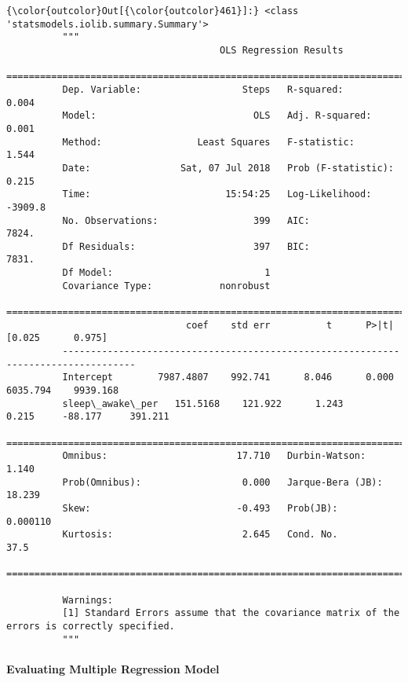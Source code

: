 \documentclass[11pt]{article}
\begin{document}
\begin{Verbatim}[commandchars=\\\{\}]
{\color{outcolor}Out[{\color{outcolor}461}]:} <class 'statsmodels.iolib.summary.Summary'>
          """
                                      OLS Regression Results                            
          ==============================================================================
          Dep. Variable:                  Steps   R-squared:                       0.004
          Model:                            OLS   Adj. R-squared:                  0.001
          Method:                 Least Squares   F-statistic:                     1.544
          Date:                Sat, 07 Jul 2018   Prob (F-statistic):              0.215
          Time:                        15:54:25   Log-Likelihood:                -3909.8
          No. Observations:                 399   AIC:                             7824.
          Df Residuals:                     397   BIC:                             7831.
          Df Model:                           1                                         
          Covariance Type:            nonrobust                                         
          ===================================================================================
                                coef    std err          t      P>|t|      [0.025      0.975]
          -----------------------------------------------------------------------------------
          Intercept        7987.4807    992.741      8.046      0.000    6035.794    9939.168
          sleep\_awake\_per   151.5168    121.922      1.243      0.215     -88.177     391.211
          ==============================================================================
          Omnibus:                       17.710   Durbin-Watson:                   1.140
          Prob(Omnibus):                  0.000   Jarque-Bera (JB):               18.239
          Skew:                          -0.493   Prob(JB):                     0.000110
          Kurtosis:                       2.645   Cond. No.                         37.5
          ==============================================================================
          
          Warnings:
          [1] Standard Errors assume that the covariance matrix of the errors is correctly specified.
          """
\end{Verbatim}
            
    \paragraph{Evaluating Multiple Regression
Model}\label{evaluating-multiple-regression-model}
\end{document}
